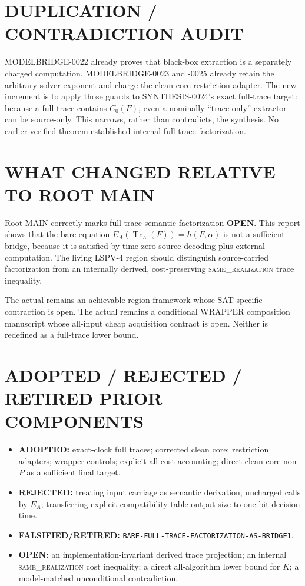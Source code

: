 \documentclass[11pt]{article}
\newcommand{\OPEN}{\textbf{OPEN}}
\newcommand{\same}{\textsc{same\_realization}}
\begin{document}
\section{DUPLICATION / CONTRADICTION AUDIT}
MODELBRIDGE-0022 already proves that black-box extraction is a separately
charged computation.  MODELBRIDGE-0023 and -0025 already retain the arbitrary
solver exponent and charge the clean-core restriction adapter.  The new
increment is to apply those guards to SYNTHESIS-0024's exact full-trace target:
because a full trace contains $C_0(F)$, even a nominally ``trace-only''
extractor can be source-only.  This narrows, rather than contradicts, the
synthesis.  No earlier verified theorem established internal full-trace
factorization.

\section{WHAT CHANGED RELATIVE TO ROOT MAIN}
Root MAIN correctly marks full-trace semantic factorization \OPEN.  This
report shows that the bare equation
$E_A(\operatorname{Tr}_A(F))=h(F,\alpha)$ is not a sufficient bridge, because
it is satisfied by time-zero source decoding plus external computation.  The
living LSPV-4 region should distinguish source-carried factorization from an
internally derived, cost-preserving \same{} trace inequality.

The actual  remains an achievable-region framework whose
SAT-specific contraction is open.  The actual  remains a
conditional WRAPPER composition manuscript whose all-input cheap acquisition
contract is open.  Neither is redefined as a full-trace lower bound.

\section{ADOPTED / REJECTED / RETIRED PRIOR COMPONENTS}
\begin{itemize}[leftmargin=*]
\item \textbf{ADOPTED:} exact-clock full traces; corrected clean core;
restriction adapters; wrapper controls; explicit all-cost accounting; direct
clean-core non-$P$ as a sufficient final target.
\item \textbf{REJECTED:} treating input carriage as semantic derivation;
uncharged calls by $E_A$; transferring explicit compatibility-table output
size to one-bit decision time.
\item \textbf{FALSIFIED/RETIRED:}
\texttt{BARE-FULL-TRACE-FACTORIZATION-AS-BRIDGE1}.
\item \textbf{OPEN:} an implementation-invariant derived trace projection; an
internal \same{} cost inequality; a direct all-algorithm lower bound for $K$;
a model-matched unconditional contradiction.
\end{itemize}
\end{document}
